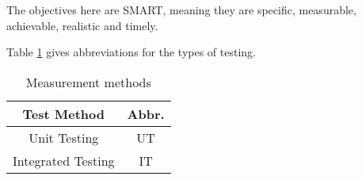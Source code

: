 The objectives here are SMART, meaning they are specific, measurable, achievable, realistic and timely.

Table \ref{tab:abbrs} gives abbreviations for the types of testing.

\begin{table}[htp]
    \centering
    \begin{tabular}{cc}
        Test Method        & Abbr. \\
        \hline
        Unit Testing       & UT    \\
        Integrated Testing & IT    \\
    \end{tabular}
    \caption{Measurement methods}
    \label{tab:abbrs}
\end{table}

\begin{table}[htp]
    \centering


\end{table}
